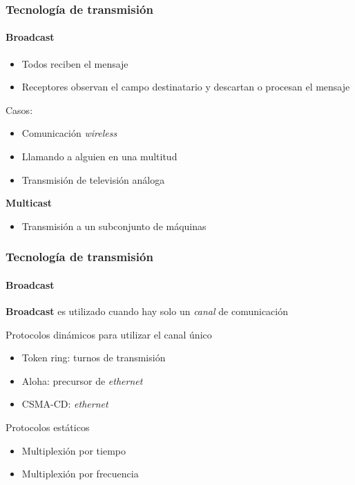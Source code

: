 \documentclass[letter]{beamer}
\begin{document}
\begin{frame}
  \frametitle{Tecnología de transmisión}
  \framesubtitle{Broadcast}

  \begin{itemize}
    \item Todos reciben el mensaje
    \item Receptores observan el campo destinatario y descartan o procesan el mensaje
  \end{itemize}
  
  Casos:
  \begin{itemize}
    \item Comunicación {\em wireless}
    \item Llamando a alguien en una multitud
    \item Transmisión de televisión análoga
  \end{itemize} 
  
  {\bf Multicast}
  \begin{itemize}
    \item Transmisión a un subconjunto de máquinas
  \end{itemize} 

\end{frame}
\begin{frame}
  \frametitle{Tecnología de transmisión}
  \framesubtitle{Broadcast}

  {\bf Broadcast} es utilizado cuando hay solo un {\em canal} de comunicación

  Protocolos dinámicos para utilizar el canal único
  \begin{itemize}
    \item Token ring: turnos de transmisión
    \item Aloha: precursor de {\em ethernet}
    \item CSMA-CD: {\em ethernet}
  \end{itemize}
  
  Protocolos estáticos
  \begin{itemize}
    \item Multiplexión por tiempo
    \item Multiplexión por frecuencia
  \end{itemize}
\end{frame}
\end{document}
